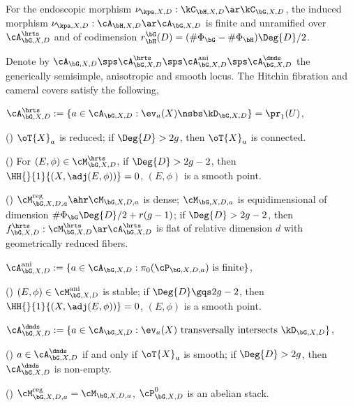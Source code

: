 \documentclass[article, a4paper, twoside]{universal}
\begin{document}
\begin{stp}
	For the endoscopic morphism $\nu_{\kpa,X,D}:\kC_{\bH,X,D}\ar\kC_{\bG,X,D}$, the induced morphism $\nu_{\kpa,X,D}:\cA_{\bH,X,D}\ar\cA_{\bG,X,D}$ is finite and unramified over $\cA_{\bG,X,D}^{\hrts}$ and of codimension $r_{\bH}^{\bG}(D)=(\#\Phi_{\bG}-\#\Phi_{\bH})\Deg{D}/2$.

\end{stp}


\begin{thm}
	Denote by $\cA_{\bG,X,D}\sps\cA_{\bG,X,D}^{\hrts}\sps\cA_{\bG,X,D}^{\text{ani}}\sps\cA_{\bG,X,D}^{\dmds}$ the generically semisimple, anisotropic and smooth locus. The Hitchin fibration and cameral covers satisfy the following,
	\begin{itm}
		\item $\cA_{\bG,X,D}^{\hrts}:=\{a\in\cA_{\bG,X,D}:\ev_{a}(X)\nsbs\kD_{\bG,X,D}\}=\pr_{1}(U)$,
		\begin{enr}[label=(\arabic*)]
			\item (\cite[Lemma~4.5.1, Proposition~4.6.1]{Ngo2010Lemme}) $\oT{X}_{a}$ is reduced; if $\Deg{D}>2g$, then $\oT{X}_{a}$ is connected.
			\item (\cite[Theorem~4.14.1]{Ngo2010Lemme}) For $(E,\phi)\in\cM_{\bG,X,D}^{\hrts}$, if $\Deg{D}>2g-2$, then $\HH{}{1}{(X,\adj(E,\phi))}=0$, $(E,\phi)$ is a smooth point.
			\item (\cite[Proposition~4.16.1, Corollary~4.16.3, Corollary~4.16.4]{Ngo2010Lemme}) $\cM_{\bG,X,D,a}^{\text{reg}}\ahr\cM_{\bG,X,D,a}$ is dense; $\cM_{\bG,X,D,a}$ is equidimensional of dimension $\#\Phi_{\bG}\Deg{D}/2+r(g-1)$; if $\Deg{D}>2g-2$, then $f_{\bG,X,D}^{\hrts}:\cM_{\bG,X,D}^{\hrts}\ar\cA_{\bG,X,D}^{\hrts}$ is flat of relative dimension $d$ with geometrically reduced fibers.
		\end{enr}
		\item $\cA_{\bG,X,D}^{\text{ani}}:=\{a\in\cA_{\bG,X,D}:\pi_{0}(\cP_{\bG,X,D,a}) \text{ is finite}\}$,
		\begin{enr}[label=(\arabic*)]
			\item {}
			\item (\cite[Lemma~6.1.2, Theorem~4.14.1]{Ngo2010Lemme}) $(E,\phi)\in\cM_{\bG,X,D}^{\text{ani}}$ is stable; if $\Deg{D}\gqs2g-2$, then $\HH{}{1}{(X,\adj(E,\phi))}=0$, $(E,\phi)$ is a smooth point.
		\end{enr}
		\item $\cA_{\bG,X,D}^{\dmds}:=\{a\in\cA_{\bG,X,D}:\ev_{a}(X) \text{ transversally intersects } \kD_{\bG,X,D}\}$,
		\begin{enr}[label=(\arabic*)]
			\item (\cite[Proposition~4.7.1, Lemma~4.7.3]{Ngo2010Lemme}) $a\in\cA_{\bG,X,D}^{\dmds}$ if and only if $\oT{X}_{a}$ is smooth; if $\Deg{D}>2g$, then $\cA_{\bG,X,D}^{\dmds}$ is non-empty.
			\item (\cite[Proposition~4.7.7]{Ngo2010Lemme}) $\cM_{\bG,X,D,a}^{\text{reg}}=\cM_{\bG,X,D,a}$, $\cP_{\bG,X,D}^{0}$ is an abelian stack.
		\end{enr}
	\end{itm}
\end{thm}
\end{document}
